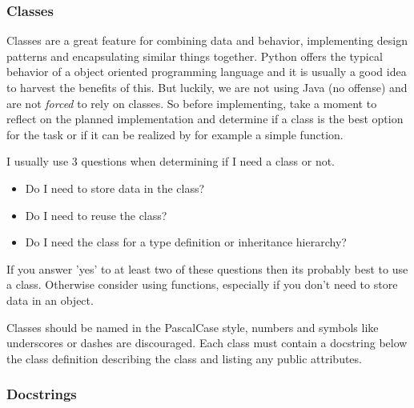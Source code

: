 \subsubsection{Classes}
Classes are a great feature for combining data and behavior, implementing
design patterns and encapsulating similar things together. Python offers the
typical behavior of a object oriented programming language and it is usually a
good idea to harvest the benefits of this. But luckily, we are not using Java
(no offense) and are not \emph{forced} to rely on classes. So before
implementing, take a moment to reflect on the planned implementation and
determine if a class is the best option for the task or if it can be realized
by for example a simple function.

I usually use 3 questions when determining if I need a class or not.

\begin{itemize}
   \item Do I need to store data in the class? 
   \item Do I need to reuse the class?
   \item Do I need the class for a type definition or inheritance hierarchy?
\end{itemize}

If you answer 'yes' to at least two of these questions then its probably best
to use a class. Otherwise consider using functions, especially if you don't
need to store data in an object.

Classes should be named in the PascalCase style, numbers and symbols like underscores
or dashes are discouraged. Each class must contain a docstring below the class
definition describing the class and listing any public attributes.


\subsubsection{Docstrings}\label{ssub:docstrings}


